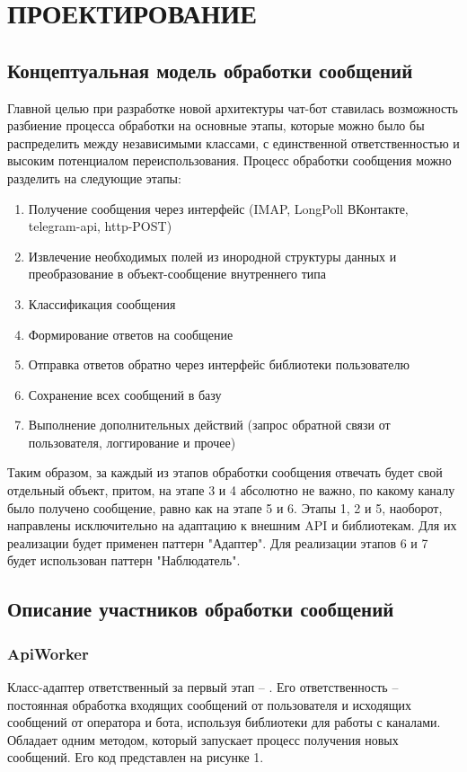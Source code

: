 \section{ПРОЕКТИРОВАНИЕ}
    \subsection{Концептуальная модель обработки сообщений}
    Главной целью при разработке новой архитектуры чат-бот ставилась возможность
    разбиение процесса обработки на основные этапы, которые можно было бы
    распределить между независимыми классами, с единственной ответственностью и
    высоким потенциалом переиспользования.
    Процесс обработки сообщения можно разделить на следующие этапы:
    \begin{enumerate}
        \item Получение сообщения через интерфейс (IMAP, LongPoll ВКонтакте, 
        telegram-api, http-POST)
        \item Извлечение необходимых полей из инородной структуры данных и 
        преобразование в объект-сообщение внутреннего типа
        \item Классификация сообщения
        \item Формирование ответов на сообщение
        \item Отправка ответов обратно через интерфейс библиотеки пользователю
        \item Сохранение всех сообщений в базу
        \item Выполнение дополнительных действий (запрос обратной связи от
        пользователя, логгирование и прочее)
    \end{enumerate}

    Таким образом, за каждый из этапов обработки сообщения отвечать будет свой 
    отдельный объект, притом, на этапе 3 и 4 абсолютно не важно, по какому 
    каналу было получено сообщение, равно как на этапе 5 и 6. Этапы 1, 2 и 5, 
    наоборот, направлены исключительно на адаптацию к внешним API и библиотекам.
    Для их реализации будет применен паттерн "Адаптер". Для реализации этапов
    6 и 7 будет использован паттерн "Наблюдатель".\cite{design.patterns}

    
    \subsection{Описание участников обработки сообщений}
    \subsubsection*{ApiWorker}
    Класс-адаптер ответственный за первый этап -- .
    Его ответственность -- постоянная обработка входящих сообщений от 
    пользователя и исходящих сообщений от оператора и бота, используя библиотеки
    для работы с каналами. Обладает одним методом, который запускает процесс 
    получения новых сообщений. Его код представлен на рисунке 1.

